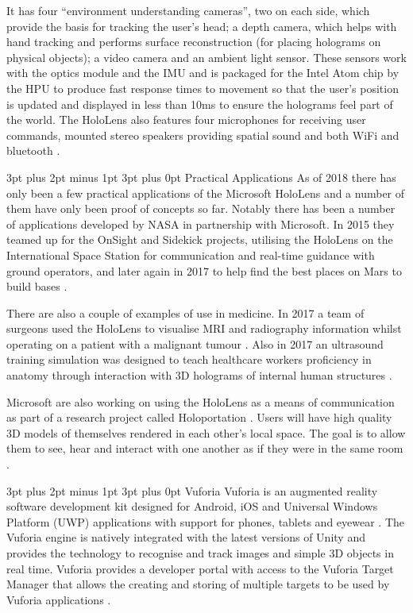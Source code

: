 \documentclass[12pt,a4paper,oneside]{article}
\makeatletter
\renewcommand\subsubsection{\@startsection {subsubsection}{1}{0mm} %
	                           {3pt plus 2pt minus 1pt} %
	                           {3pt plus 0pt} %
	                           {\normalfont\bfseries}}
\renewcommand\subsection{\@startsection {subsection}{1}{0mm} %
                               {3pt plus 2pt minus 1pt} %
                               {3pt plus 0pt} %
                               {\large\bfseries}}
\makeatother
\begin{document}
It has four ``environment understanding cameras'', two on each side, which provide the basis for tracking the user's head; a depth camera, which helps with hand tracking and performs surface reconstruction (for placing holograms on physical objects); a video camera and an ambient light sensor. These sensors work with the optics module and the IMU and is packaged for the Intel Atom chip by the HPU to produce fast response times to movement so that the user's position is updated and displayed in less than 10ms to ensure the holograms feel part of the world. The HoloLens also features four microphones for receiving user commands, mounted stereo speakers providing spatial sound and both WiFi and bluetooth \cite{colaner16}.

\subsubsection{Practical Applications}
As of 2018 there has only been a few practical applications of the Microsoft HoloLens and a number of them have only been proof of concepts so far. Notably there has been a number of applications developed by NASA in partnership with Microsoft. In 2015 they teamed up for the OnSight and Sidekick projects, utilising the HoloLens on the International Space Station for communication and real-time guidance with ground operators, and later again in 2017 to help find the best places on Mars to build bases \cite{nasa15, microsoftnews17}.

There are also a couple of examples of use in medicine. In 2017 a team of surgeons used the HoloLens to visualise MRI and radiography information whilst operating on a patient with a malignant tumour \cite{bernardo17, 3ders17}. Also in 2017 an ultrasound training simulation was designed to teach healthcare workers proficiency in anatomy through interaction with 3D holograms of internal human structures \cite{lynn17, mahmood17}.

Microsoft are also working on using the HoloLens as a means of communication as part of a research project called Holoportation \cite{cutler17}. Users will have high quality 3D models of themselves rendered in each other's local space. The goal is to allow them to see, hear and interact with one another as if they were in the same room \cite{orts16}.

\subsection{Vuforia}
Vuforia is an augmented reality software development kit designed for Android, iOS and Universal Windows Platform (UWP) applications with support for phones, tablets and eyewear \cite{vuforia, vuforiaeyewear}. The Vuforia engine is natively integrated with the latest versions of Unity and provides the technology to recognise and track images and simple 3D objects in real time. Vuforia provides a developer portal with access to the Vuforia Target Manager that allows the creating and storing of multiple targets to be used by Vuforia applications \cite{vuforiatargetmanager}.
\end{document}
